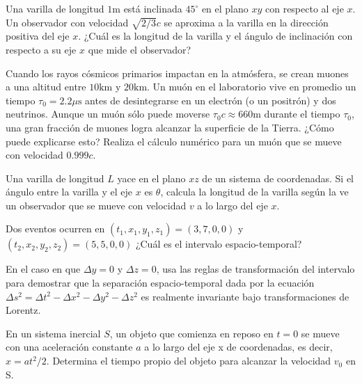 \documentclass[12pt]{article}
\newenvironment{exercise}[2][Ejercicio]{\begin{trivlist} 
\item[\hskip \labelsep {\bfseries #1}\hskip \labelsep {\bfseries #2.}]}{\end{trivlist}}
\begin{document}
\begin{exercise}{1.4} Una varilla de longitud $1 \text{m}$ está inclinada $45^\circ$ en el plano $xy$ con respecto al eje $x$. Un observador con velocidad $\sqrt{2/3}c$ se aproxima a la varilla en la dirección positiva del eje $x$. ¿Cuál es la longitud de la varilla y el ángulo de inclinación con respecto a su eje $x$ que mide el observador?
\end{exercise}

\begin{exercise}{1.5} Cuando los rayos cósmicos primarios impactan en la atmósfera, se crean muones a una altitud entre $10 \text{km}$ y $20 \text{km}$. Un muón en el laboratorio vive en promedio un tiempo $\tau_0 = 2.2 \mu\text{s}$ antes de desintegrarse en un electrón (o un positrón) y dos neutrinos. Aunque un muón sólo puede moverse $\tau_0 c \approx 660 \text{m}$ durante el tiempo $\tau_0$, una gran fracción de muones logra alcanzar la superficie de la Tierra. ¿Cómo puede explicarse esto? Realiza el cálculo numérico para un muón que se mueve con velocidad $0.999c$.
\end{exercise}

\begin{exercise}{1.6}
Una varilla de longitud $L$ yace en el plano $xz$ de un sistema de coordenadas. Si el ángulo entre la varilla y el eje $x$ es $\theta$, calcula la longitud de la varilla según la ve un observador que se mueve con velocidad $v$ a lo largo del eje $x$.    
\end{exercise}

\begin{exercise}{1.7}
Dos eventos ocurren en $(t_1, x_1, y_1, z_1)=(3, 7, 0, 0)$ y $(t_2, x_2, y_2, z_2)=(5, 5, 0, 0)$ ¿Cuál es el intervalo espacio-temporal?    
\end{exercise}

\begin{exercise}{1.8}
En el caso en que $\Delta y =0$ y $\Delta z =0$, usa las reglas de transformación del intervalo para demostrar que la separación espacio-temporal dada por la ecuación $\Delta s^2 = \Delta t^2 - \Delta x^2 - \Delta y^2 - \Delta z^2$ es realmente invariante bajo transformaciones de Lorentz.
\end{exercise}  

\begin{exercise}{1.9}
En un sistema inercial $S$, un objeto que comienza en reposo en $t=0$ se mueve con una aceleración constante $a$ a lo largo del eje x de coordenadas, es decir, $x=at^2/2$. Determina el tiempo propio del objeto para alcanzar la velocidad $v_0$ en S.
\end{exercise}
\end{document}
